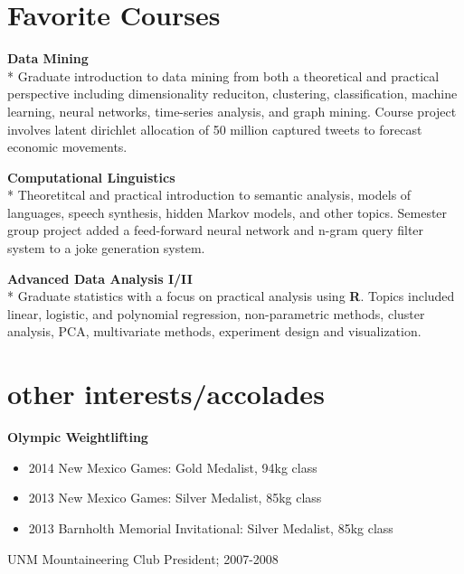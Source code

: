 \documentclass[]{friggeri-cv} %
\begin{document}
\section{Favorite Courses}
\begin{description}
  \item \textbf{Data Mining } \\*
    Graduate introduction to data mining from both a theoretical and practical
    perspective including dimensionality reduciton, clustering, classification,
    machine learning, neural networks, time-series analysis, and graph mining.
    Course project involves latent dirichlet allocation of 50 million captured
    tweets to forecast economic movements. \hfill
   \item \textbf{Computational Linguistics} \\*
     Theoretitcal and practical introduction to semantic analysis, models of
     languages, speech synthesis, hidden Markov models, and other topics.
     Semester group project added a feed-forward neural network and n-gram
     query filter system to a joke generation system. \hfill
 \item \textbf{Advanced Data Analysis I/II} \\*
     Graduate statistics with a focus on practical analysis using \textbf{R}.
     Topics included linear, logistic, and polynomial regression,
     non-parametric methods, cluster analysis, PCA, multivariate methods,
     experiment design and visualization.
\end{description}


\section{other interests/accolades}
\textbf{Olympic Weightlifting}
\begin{itemize}
\item 2014 New Mexico Games: Gold Medalist, 94kg class
\item 2013 New Mexico Games: Silver Medalist, 85kg class
\item 2013 Barnholth Memorial Invitational: Silver Medalist, 85kg class
\end{itemize}
UNM Mountaineering Club President; 2007-2008
\end{document}
